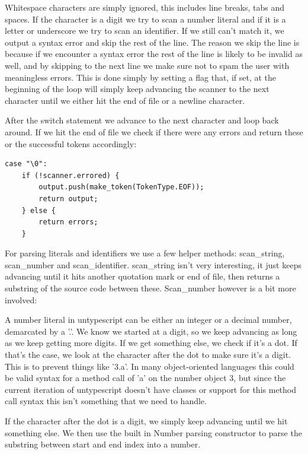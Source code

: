 \documentclass[12pt,a4paper]{article}
\begin{document}
Whitespace characters are simply ignored, this includes line breaks, tabs and spaces.
If the character is a digit we try to scan a number literal and if it is a letter or underscore we try to scan an identifier. If we still can't match it, we output a syntax error and skip the rest of the line. 
The reason we skip the line is because if we encounter a syntax error the rest of the line is likely to be invalid as well, and by skipping to the next line we make sure not to spam the user with meaningless errors. This is done simply by setting a flag that, if set, at the beginning of the loop will simply keep advancing the scanner to the next character until we either hit the end of file or a newline character.

After the switch statement we advance to the next character and loop back around. If we hit the end of file we check if there were any errors and return these or the successful tokens accordingly:

\begin{lstlisting}
case "\0":
    if (!scanner.errored) {
        output.push(make_token(TokenType.EOF));
        return output;
    } else {
        return errors;
    }
\end{lstlisting}

For parsing literals and identifiers we use a few helper methods: scan\_string, scan\_number and scan\_identifier. scan\_string isn't very interesting, it just keeps advancing until it hits another quotation mark or end of file, then returns a substring of the source code between these. Scan_number however is a bit more involved:



\newpage

A number literal in untypescript can be either an integer or a decimal number, demarcated by a '.'. We know we started at a digit, so we keep advancing as long as we keep getting more digits. If we get something else, we check if it's a dot. If that's the case, we look at the character after the dot to make sure it's a digit. This is to prevent things like '3.a'. 
In many object-oriented languages this could be valid syntax for a method call of 'a' on the number object 3, but since the current iteration of untypescript doesn't have classes or support for this method call syntax this isn't something that we need to handle.

If the character after the dot is a digit, we simply keep advancing until we hit something else. We then use the built in Number parsing constructor to parse the substring between start and end index into a number.
\end{document}
